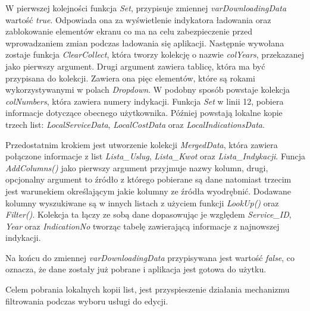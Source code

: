  W pierwszej kolejności funkcja \emph{Set}, przypisuje zmiennej \textit{varDownloadingData} wartość \textit{true}.
 Odpowiada ona za wyświetlenie indykatora ładowania oraz zablokowanie elementów ekranu co ma na celu zabezpieczenie przed wprowadzaniem zmian podczas ładowania się aplikacji.
Następnie wywołana zostaje funkcja \emph{ClearCollect}, która tworzy kolekcję o nazwie \textit{colYears}, przekazanej jako pierwszy argument. Drugi argument zawiera tablicę, która ma być przypisana do kolekcji. Zawiera ona pięc elementów, które są rokami wykorzystywanymi w polach \emph{Dropdown}.
W podobny sposób powstaje kolekcja \textit{colNumbers}, która zawiera numery indykacji.
Funkcja \emph{Set} w linii 12, pobiera informacje dotyczące obecnego użytkownika. 
Później powstają lokalne kopie trzech list: \textit{LocalServiceData}, \textit{LocalCostData} oraz \textit{LocalIndicationsData}.

Przedostatnim krokiem jest utworzenie kolekcji \textit{MergedData}, która zawiera połączone informacje z list \textit{Lista\_Uslug}, \textit{Lista\_Kwot} oraz \textit{Lista\_Indykacji}.
Funcja \emph{AddColumns()} jako pierwszy argument przyjmuje nazwy kolumn, drugi, opcjonalny argument to źródło z którego pobierane są dane natomiast trzecim jest warunekiem określającym jakie kolumny ze źródła wyodrębnić. Dodawane kolumny wyszukiwane są w innych listach z użyciem funkcji \emph{LookUp()} oraz \emph{Filter()}.
Kolekcja ta łączy ze sobą dane dopasowując je  względem \emph{Service\_ID}, \emph{Year} oraz \emph{IndicationNo} tworząc tabelę zawierającą informacje z najnowszej indykacji.

Na końcu do zmiennej \textit{varDownloadingData} przypisywana jest wartość \textit{false}, co oznacza, że dane zostały już pobrane i aplikacja jest gotowa do użytku.

Celem pobrania lokalnych kopii list, jest przyspieszenie działania mechanizmu filtrowania podczas wyboru usługi do edycji. 



